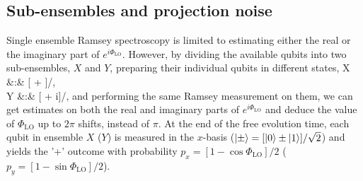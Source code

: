 \subsection{Sub-ensembles and projection noise}
Single ensemble Ramsey spectroscopy is limited to estimating
either the real or the imaginary part of $e^{i\Phi_\mathrm{LO}}$. However, by
dividing the available qubits into two sub-ensembles, $X$ and $Y$, preparing
their individual qubits in different states,
\bal
	\label{eq:X_ensemble_uncorr}
	X &:\quad& [ + ]/,\\
	\label{eq:Y_ensemble_uncorr}
	Y &:\quad& [ + i]/,
\eal
and performing the same Ramsey measurement on them, we can get
 estimates on both the real and imaginary parts of $e^{i\Phi_\mathrm{LO}}$ and
deduce the value of $\Phi_\mathrm{LO}$ up to $2\pi$ shifts, instead of $\pi$.
At the end of the free evolution time, each qubit in ensemble $X$ ($Y$) is
measured in the $x$-basis ($| \pm \rangle = [| 0 \rangle\pm| 1 \rangle]/\sqrt{2}$) and yields the
'+' outcome with probability $p_x = [1-\cos\Phi_\mathrm{LO}]/2$ ($p_y =
[1-\sin\Phi_\mathrm{LO}]/2$).
% 

